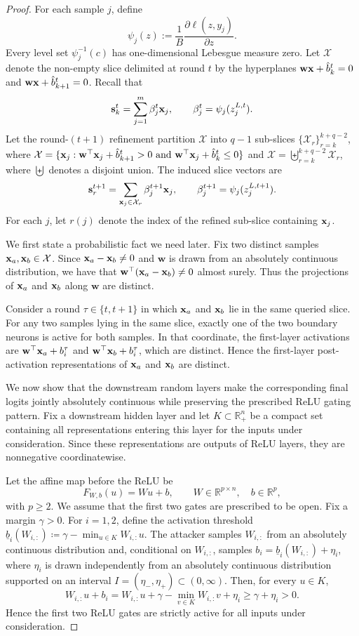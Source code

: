 \begin{proof}
For each sample $j$, define
\[
\psi_j(z)
:=
\frac{1}{B}\frac{\partial \ell(z,y_j)}{\partial z}.
\]
Every level set $\psi_j^{-1}(c)$ has one-dimensional Lebesgue
measure zero.
Let $\mathcal X$ denote the non-empty slice delimited at round $t$ by the hyperplanes
$\mathbf w {\mathbf{x}}+\hat b_k^t=0$ and $\mathbf w {\mathbf{x}}+\hat b_{k+1}^t=0$. Recall that
\[
\mathbf{s}_k^t
=
\sum_{j=1}^m \beta_j^t {\mathbf{x}}_j,
\qquad
\beta_j^t
=
\psi_j(z_j^{L,t}).
\]
Let the round-$(t+1)$ refinement partition $\mathcal X$ into $q-1$ sub-slices
$\{\mathcal X_r\}_{r=k}^{k+q-2}$, where $\mathcal X
=
\{
{\mathbf{x}}_j :
\mathbf w^\top {\mathbf{x}}_j+\hat b_{k+1}^t>0
\ \text{and}\
\mathbf w^\top {\mathbf{x}}_j+\hat b_k^t\le 0
\}$ and $\mathcal X=\biguplus_{r=k}^{k+q-2}\mathcal X_r$,
where $\biguplus$ denotes a disjoint union. The induced slice vectors are
\[
\mathbf{s}_r^{t+1}
=
\sum_{{\mathbf{x}}_j\in\mathcal X_r}\beta_j^{t+1}{\mathbf{x}}_j,
\qquad
\beta_j^{t+1}=\psi_j(z_j^{L,t+1}).
\]
For each $j$, let $r(j)$ denote the index of the refined sub-slice containing
${\mathbf{x}}_j$.

We first state a probabilistic fact we need later. Fix two distinct samples
${\mathbf{x}}_a,{\mathbf{x}}_b\in\mathcal X$. Since ${\mathbf{x}}_a-{\mathbf{x}}_b\neq 0$ and $\mathbf w$ is drawn from
an absolutely continuous distribution, we have that $\mathbf w^\top({\mathbf{x}}_a-{\mathbf{x}}_b)\neq 0$ almost surely. Thus the projections of ${\mathbf{x}}_a$ and ${\mathbf{x}}_b$ along $\mathbf w$ are distinct.

Consider a round $\tau\in\{t,t+1\}$ in which ${\mathbf{x}}_a$ and ${\mathbf{x}}_b$ lie in the same
queried slice. 
For any two samples lying in the same slice, exactly one of the two boundary neurons is active for both samples. In that coordinate,
the first-layer activations are $\mathbf w^\top {\mathbf{x}}_a+b_i^\tau$ and $\mathbf w^\top {\mathbf{x}}_b+b_i^\tau$, which are distinct. Hence the first-layer post-activation representations of
${\mathbf{x}}_a$ and ${\mathbf{x}}_b$ are distinct.

We now show that the downstream random layers make the corresponding final
logits jointly absolutely continuous while preserving the prescribed ReLU
gating pattern. Fix a downstream hidden layer and let $K\subset \mathbb R_+^n$
be a compact set containing all representations entering this layer for the
inputs under consideration. Since these representations are outputs of ReLU
layers, they are nonnegative coordinatewise.

Let the affine map before the ReLU be
\[
F_{W,b}(u)=Wu+b,
\qquad
W\in\mathbb R^{p\times n},\quad b\in\mathbb R^p,
\]
with $p\ge 2$. We assume that the first two gates are prescribed to be open.
Fix a margin $\gamma>0$. For $i=1,2$, define the activation threshold
$\underline b_i(W_{i,:}) \coloneqq \gamma-\min_{u\in K} W_{i,:}u$.
The attacker samples $W_{i,:}$ from an absolutely continuous distribution and,
conditional on $W_{i,:}$, samples
$b_i = \underline b_i(W_{i,:})+\eta_i$, where $\eta_i$ is drawn independently from an absolutely continuous
distribution supported on an interval $I=(\eta_-,\eta_+)\subset (0,\infty)$.
Then, for every $u\in K$,
\[
W_{i,:}u+b_i
=
W_{i,:}u
+
\gamma-\min_{v\in K}W_{i,:}v
+
\eta_i
\ge
\gamma+\eta_i
>0.
\]
Hence the first two ReLU gates are strictly active for all inputs under
consideration.


\end{proof}
